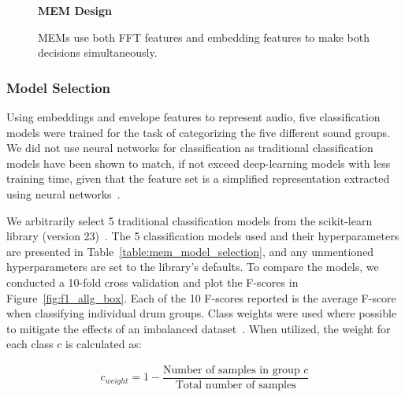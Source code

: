 \documentclass[\main/thesis.tex]{subfiles}
\begin{document}
\begin{figure}[tbp]
    \begin{center}
    \textbf{MEM Design}
    \end{center}
    \caption{MEMs use both FFT features and embedding features to make both decisions simultaneously. }
\label{fig:TPE_design}
\end{figure}

\subsubsection{Model Selection}
Using embeddings and envelope features to represent audio, five classification models were trained for the task of categorizing the five different sound groups. We did not use neural networks for classification as traditional classification models have been shown to match, if not exceed deep-learning models with less training time, given that the feature set is a simplified representation extracted using neural networks~\cite{notley2018examining}.

 We arbitrarily select 5 traditional classification models from the scikit-learn library (version 23)~\cite{pedregosa2011scikit}. The 5 classification models used and their hyperparameters are presented in Table~\ref{table:mem_model_selection}, and any unmentioned hyperparameters are set to the library's defaults. To compare the models, we conducted a 10-fold cross validation and plot the F-scores in Figure~\ref{fig:f1_allg_box}. Each of the 10 F-scores reported is the average F-score when classifying individual drum groups. Class weights were used where possible to mitigate the effects of an imbalanced dataset~\cite{provost2000machine,chawla2004special}. When utilized, the weight for each class $c$ is calculated as:

\begin{subequations}
    \begin{align*}
    c_{weight} = 1-\dfrac{\text{Number of samples in group $c$} }{\text{Total number of samples}}
    \end{align*}
\end{subequations}
\end{document}
